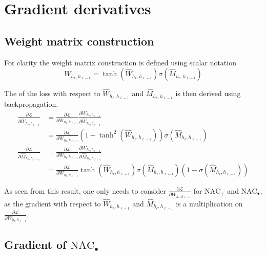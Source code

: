 \section{Gradient derivatives}
\label{sec:appendix:gradient-derivatives}

\subsection{Weight matrix construction}
\label{sec:appendix:gradient-derivatives:weight-matrix-construction}
For clarity the weight matrix construction is defined using scalar notation
\begin{equation}
W_{h_\ell, h_{\ell-1}} = \tanh(\hat{W}_{h_\ell, h_{\ell-1}}) \sigma(\hat{M}_{h_\ell, h_{\ell-1}})
\end{equation}

The of the loss with respect to $\hat{W}_{h_\ell, h_{\ell-1}}$ and $\hat{M}_{h_\ell, h_{\ell-1}}$ is then derived using backpropagation.
\begin{equation}
\begin{aligned}
\frac{\partial\mathcal{L}}{\partial \hat{W}_{h_\ell, h_{\ell-1}}} &= \frac{\partial\mathcal{L}}{\partial W_{h_\ell, h_{\ell-1}}} \frac{\partial W_{h_\ell, h_{\ell-1}}}{\partial \hat{W}_{h_\ell, h_{\ell-1}}} \\
&= \frac{\partial\mathcal{L}}{\partial W_{h_\ell, h_{\ell-1}}} (1 - \tanh^2(\hat{W}_{h_\ell, h_{\ell-1}})) \sigma(\hat{M}_{h_\ell, h_{\ell-1}}) \\
\frac{\partial\mathcal{L}}{\partial \hat{M}_{h_\ell, h_{\ell-1}}} &= \frac{\partial\mathcal{L}}{\partial W_{h_\ell, h_{\ell-1}}} \frac{\partial W_{h_\ell, h_{\ell-1}}}{\partial \hat{M}_{h_\ell, h_{\ell-1}}} \\
&= \frac{\partial\mathcal{L}}{\partial W_{h_\ell, h_{\ell-1}}} \tanh(\hat{W}_{h_\ell, h_{\ell-1}}) \sigma(\hat{M}_{h_\ell, h_{\ell-1}}) (1 - \sigma(\hat{M}_{h_\ell, h_{\ell-1}}))
\end{aligned}
\end{equation}

As seen from this result, one only needs to consider $\frac{\partial\mathcal{L}}{\partial W_{h_\ell, h_{\ell-1}}}$ for $\mathrm{NAC}_{+}$ and $\mathrm{NAC}_{\bullet}$, as the gradient with respect to $\hat{W}_{h_\ell, h_{\ell-1}}$ and $\hat{M}_{h_\ell, h_{\ell-1}}$ is a multiplication on $\frac{\partial\mathcal{L}}{\partial W_{h_\ell, h_{\ell-1}}}$.

\subsection{Gradient of \texorpdfstring{$\mathrm{NAC}_{\bullet}$}{NAC-mul}}
\label{sec:appendix:gradient-derivatives:gradient-nac-mul}


